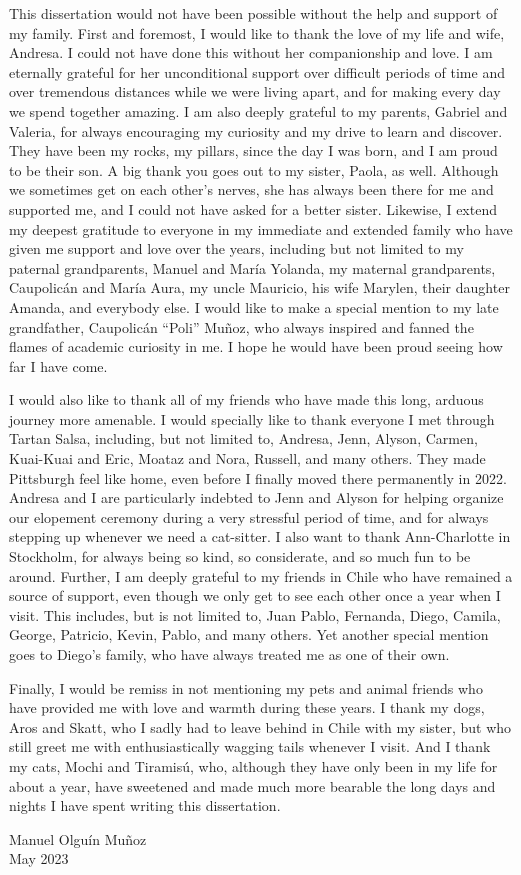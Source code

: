 This dissertation would not have been possible without the help and support of my family.
First and foremost, I would like to thank the love of my life and wife, Andresa.
I could not have done this without her companionship and love.
I am eternally grateful for her unconditional support over difficult periods of time and over tremendous distances while we were living apart, and for making every day we spend together amazing.
I am also deeply grateful to my parents, Gabriel and Valeria, for always encouraging my curiosity and my drive to learn and discover.
They have been my rocks, my pillars, since the day I was born, and I am proud to be their son.
A big thank you goes out to my sister, Paola, as well.
Although we sometimes get on each other's nerves, she has always been there for me and supported me, and I could not have asked for a better sister.
Likewise, I extend my deepest gratitude to everyone in my immediate and extended family who have given me support and love over the years, including but not limited to my paternal grandparents, Manuel and María Yolanda, my maternal grandparents, Caupolicán and María Aura, my uncle Mauricio, his wife Marylen, their daughter Amanda, and everybody else.
I would like to make a special mention to my late grandfather, Caupolicán ``Poli'' Muñoz, who always inspired and fanned the flames of academic curiosity in me.
I hope he would have been proud seeing how far I have come.

I would also like to thank all of my friends who have made this long, arduous journey more amenable.
I would specially like to thank everyone I met through Tartan Salsa, including, but not limited to, Andresa, Jenn, Alyson, Carmen, Kuai-Kuai and Eric, Moataz and Nora, Russell, and many others.
They made Pittsburgh feel like home, even before I finally moved there permanently in 2022.
Andresa and I are particularly indebted to Jenn and Alyson for helping organize our elopement ceremony during a very stressful period of time, and for always stepping up whenever we need a cat-sitter.
I also want to thank Ann-Charlotte in Stockholm, for always being so kind, so considerate, and so much fun to be around.
Further, I am deeply grateful to my friends in Chile who have remained a source of support, even though we only get to see each other once a year when I visit.
This includes, but is not limited to, Juan Pablo, Fernanda, Diego, Camila, George, Patricio, Kevin, Pablo, and many others.
Yet another special mention goes to Diego's family, who have always treated me as one of their own.

Finally, I would be remiss in not mentioning my pets and animal friends who have provided me with love and warmth during these years.
I thank my dogs, Aros and Skatt, who I sadly had to leave behind in Chile with my sister, but who still greet me with enthusiastically wagging tails whenever I visit.
And I thank my cats, Mochi and Tiramisú, who, although they have only been in my life for about a year, have sweetened and made much more bearable the long days and nights I have spent writing this dissertation.

\medskip
{\begin{flushright}
    Manuel Olguín Muñoz\\
    May 2023
\end{flushright}}
